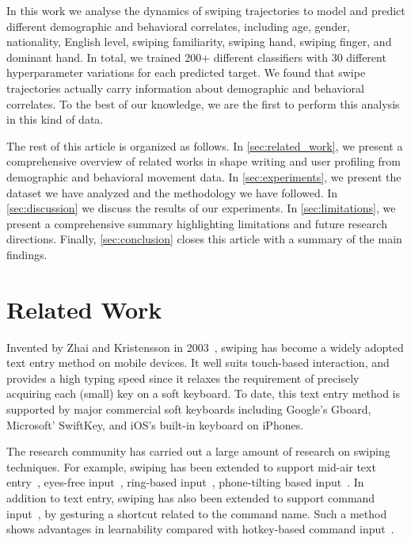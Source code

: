 \documentclass[sn-mathphys, pdflatex]{sn-jnl}
\begin{document}
In this work we analyse the dynamics of swiping trajectories to model and predict different demographic and behavioral correlates,
including age, gender, nationality, English level, swiping familiarity, swiping hand, swiping finger, and dominant hand.
In total, we trained 200+ different classifiers with 30 different hyperparameter variations for each predicted target.
We found that swipe trajectories actually carry information about demographic and behavioral correlates.
To the best of our knowledge, we are the first to perform this analysis in this kind of data.

The rest of this article is organized as follows. In \autoref{sec:related_work}, we present a comprehensive overview of related works in shape writing and user profiling from demographic and behavioral movement data. In \autoref{sec:experiments}, we present the dataset we have analyzed and the methodology we have followed. In \autoref{sec:discussion} we discuss the results of our experiments. In \autoref{sec:limitations}, we present a comprehensive summary highlighting limitations and future research directions. Finally, \autoref{sec:conclusion} closes this article with a summary of the main findings.


\section{Related Work}
\label{sec:related_work}


Invented by Zhai and Kristensson in 2003~\cite{Zhai03},
swiping has become a widely adopted text entry method on mobile devices.
It well suits touch-based interaction, and provides a high typing speed
since it relaxes the requirement of precisely acquiring each (small) key on a soft keyboard.
To date, this text entry method is supported by major commercial soft keyboards
including Google's Gboard, Microsoft' SwiftKey, and iOS's built-in keyboard on iPhones.

The research community has carried out a large amount of research on swiping techniques.
For example, swiping has been extended to support mid-air text entry~\cite{Markussen:2014:VMW}, eyes-free input~\cite{zhu2019sfree}, ring-based input~\cite{gupta2019rotoswype}, phone-tilting based input~\cite{yeo2017investigating}.
In addition to text entry, swiping has also been extended to support command input~\cite{kristensson2007command, alvina2017commandboard, cui2019hotstrokes},
by gesturing a shortcut related to the command name.
Such a method shows advantages in learnability compared with hotkey-based command input~\cite{cui2019hotstrokes}.
\end{document}
